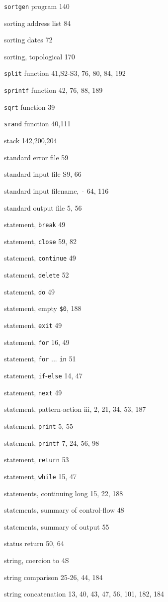 \begin{multicols}{3}
\verb'sortgen' program 140

sorting address list 84

sorting dates 72

sorting, topological 170

\verb'split' function 41,S2-S3, 76, 80, 84, 192

\verb'sprintf' function 42, 76, 88, 189

\verb'sqrt' function 39

\verb'srand' function 40,111

stack 142,200,204

standard error file 59

standard input file S9, 66

standard input filename, \verb'-' 64, 116

standard output file 5, 56

statement, \verb'break' 49

statement, \verb'close' 59, 82

statement, \verb'continue' 49

statement, \verb'delete' 52

statement, \verb'do' 49

statement, empty \verb'$0', 188

statement, \verb'exit' 49

statement, \verb'for' 16, 49

statement, \verb'for' ... \verb'in' 51

statement, \verb'if'-\verb'else' 14, 47

statement, \verb'next' 49

statement, pattern-action iii, 2, 21, 34, 53, 187

statement, \verb'print' 5, 55

statement, \verb'printf' 7, 24, 56, 98

statement, \verb'return' 53

statement, \verb'while' 15, 47

statements, continuing long 15, 22, 188

statements, summary of control-flow 48

statements, summary of output 55

status return 50, 64

string, coercion to 4S

string comparison 25-26, 44, 184

string concatenation 13, 40, 43,  47, 56, 101, 182, 184


\end{multicols}
